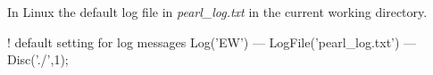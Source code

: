 In Linux the default log file in {\em pearl\_log.txt} in the current working
directory.

\begin{PEARLCode}
! default setting for log messages
Log('EW') --- LogFile('pearl_log.txt') --- Disc('./',1);
\end{PEARLCode}

